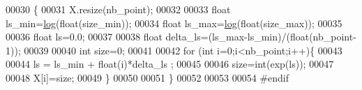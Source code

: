 \begin{DoxyCode}
00030 \{
00031   X.resize(nb\_point);
00032 
00033   \textcolor{keywordtype}{float} ls\_min=\hyperlink{structlog}{log}(\textcolor{keywordtype}{float}(size\_min));
00034   \textcolor{keywordtype}{float} ls\_max=\hyperlink{structlog}{log}(\textcolor{keywordtype}{float}(size\_max));
00035 
00036   \textcolor{keywordtype}{float} ls=0.0;
00037 
00038   \textcolor{keywordtype}{float} delta\_ls=(ls\_max-ls\_min)/(\textcolor{keywordtype}{float}(nb\_point-1));
00039 
00040   \textcolor{keywordtype}{int} size=0;
00041 
00042   \textcolor{keywordflow}{for} (\textcolor{keywordtype}{int} i=0;i<nb\_point;i++)\{
00043 
00044     ls = ls\_min + float(i)*delta\_ls ;
00045     
00046     size=int(exp(ls)); 
00047 
00048     X[i]=size;
00049   \}
00050 
00051 \}
00052 
00053 
00054 \textcolor{preprocessor}{#endif}
\end{DoxyCode}
